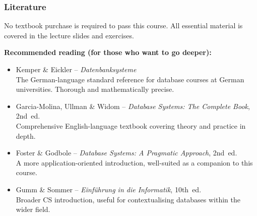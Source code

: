 \begin{frame}
  \frametitle{Literature}

  \begin{alertblock}{No textbook purchase is required to pass this course.}
    All essential material is covered in the lecture slides and exercises.
  \end{alertblock}

  \textbf{Recommended reading (for those who want to go deeper):}

  \begin{itemize}
    \item Kemper \& Eickler -- \textit{Datenbanksysteme}\\
          \footnotesize The German-language standard reference for database courses at German universities. Thorough and mathematically precise.\normalsize

    \item Garcia-Molina, Ullman \& Widom -- \textit{Database Systems: The Complete Book}, 2nd~ed.\\
          \footnotesize Comprehensive English-language textbook covering theory and practice in depth.\normalsize

    \item Foster \& Godbole -- \textit{Database Systems: A Pragmatic Approach}, 2nd~ed.\\
          \footnotesize A more application-oriented introduction, well-suited as a companion to this course.\normalsize

    \item Gumm \& Sommer -- \textit{Einführung in die Informatik}, 10th~ed.\\
          \footnotesize Broader CS introduction, useful for contextualising databases within the wider field.\normalsize
  \end{itemize}

\end{frame}

